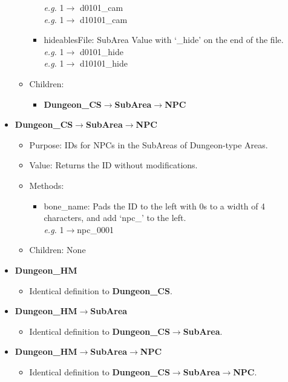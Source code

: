\documentclass{article}
\begin{document}
\begin{itemize}
\begin{itemize}
\begin{itemize}
			\textit{e.g.} 1$\rightarrow$ d0101\_cam\\
			\textit{e.g.} 1$\rightarrow$ d10101\_cam
			\item hideablesFile: SubArea Value with `\_hide' on the end of the file.\\
			\textit{e.g.} 1$\rightarrow$ d0101\_hide\\
			\textit{e.g.} 1$\rightarrow$ d10101\_hide
		\end{itemize}
		\item Children:
		\begin{itemize}
			\item \textbf{Dungeon\_CS}$\rightarrow$\textbf{SubArea}$\rightarrow$\textbf{NPC}
		\end{itemize}
	\end{itemize}
	
	\item \textbf{Dungeon\_CS}$\rightarrow$\textbf{SubArea}$\rightarrow$\textbf{NPC}
	\begin{itemize}
		\item Purpose: IDs for NPCs in the SubAreas of Dungeon-type Areas.
		\item Value: Returns the ID without modifications.
		\item Methods:
		\begin{itemize}
			\item bone\_name: Pads the ID to the left with 0s to a width of 4 characters, and add `npc\_' to the left.\\
			\textit{e.g.} 1$\rightarrow$npc\_0001
		\end{itemize}
		\item Children: None
	\end{itemize}
	
	\item \textbf{Dungeon\_HM}
	\begin{itemize}
		\item Identical definition to \textbf{Dungeon\_CS}.
	\end{itemize}
	
	\item \textbf{Dungeon\_HM}$\rightarrow$\textbf{SubArea}
	\begin{itemize}
		\item Identical definition to \textbf{Dungeon\_CS}$\rightarrow$\textbf{SubArea}.
	\end{itemize}
	
	\item \textbf{Dungeon\_HM}$\rightarrow$\textbf{SubArea}$\rightarrow$\textbf{NPC}
	\begin{itemize}
		\item Identical definition to \textbf{Dungeon\_CS}$\rightarrow$\textbf{SubArea}$\rightarrow$\textbf{NPC}.
	\end{itemize}
	

\end{itemize}
\end{document}
